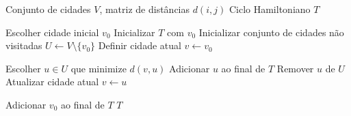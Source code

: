 \begin{algorithm}[H]
\caption{Heurística Gulosa para o TSP (Vizinho Mais Próximo)}
\label{alg:tsp_greedy}
\begin{algorithmic}

\Require Conjunto de cidades $V$, matriz de distâncias $d(i,j)$
\Ensure Ciclo Hamiltoniano $T$

\State Escolher cidade inicial $v_0$
\State Inicializar $T$ com $v_0$
\State Inicializar conjunto de cidades não visitadas $U \gets V \setminus \{v_0\}$
\State Definir cidade atual $v \gets v_0$

    \State Escolher $u \in U$ que minimize $d(v,u)$
    \State Adicionar $u$ ao final de $T$
    \State Remover $u$ de $U$
    \State Atualizar cidade atual $v \gets u$
\EndWhile

\State Adicionar $v_0$ ao final de $T$ 
\State \Return $T$

\end{algorithmic}
\end{algorithm}